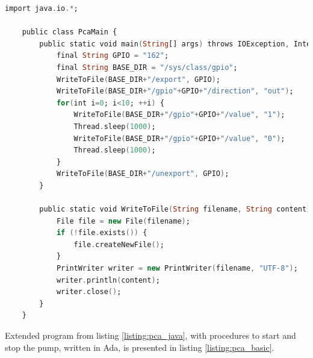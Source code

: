 \begin{lstlisting}[language=ada, frame=single, gobble=0, caption={Turning pin on and off in Java}, label={listing:pca_java}]
	import java.io.*;

	public class PcaMain {
		public static void main(String[] args) throws IOException, InterruptedException {
			final String GPIO = "162";
			final String BASE_DIR = "/sys/class/gpio";			
			WriteToFile(BASE_DIR+"/export", GPIO);
			WriteToFile(BASE_DIR+"/gpio"+GPIO+"/direction", "out");			
			for(int i=0; i<10; ++i) {
	            WriteToFile(BASE_DIR+"/gpio"+GPIO+"/value", "1");
	            Thread.sleep(1000);
				WriteToFile(BASE_DIR+"/gpio"+GPIO+"/value", "0");
	            Thread.sleep(1000);
			}			
			WriteToFile(BASE_DIR+"/unexport", GPIO);
		}
		
		public static void WriteToFile(String filename, String content) throws IOException {
			File file = new File(filename);			 
			if (!file.exists()) {
				file.createNewFile();
			}
			PrintWriter writer = new PrintWriter(filename, "UTF-8");
			writer.println(content);
			writer.close();
		}
	}
\end{lstlisting} 

Extended program from listing \ref{listing:pca_java}, with procedures to start and stop the pump, written in Ada, is presented in listing \ref{listing:pca_basic}.

